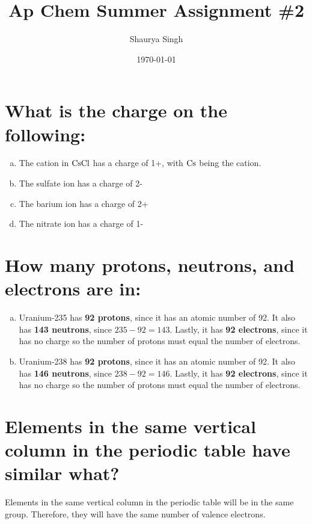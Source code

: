 \documentclass[11pt]{article}
\author{Shaurya Singh}
\date{\today}
\title{Ap Chem Summer Assignment \#2}
\begin{document}
\maketitle

\section{What is the charge on the following:}
\label{sec:org0d3ab7a}
\begin{enumerate}[(a)]
\item The cation in \(\ce{CsCl}\) has a charge of 1+, with \(\ce{Cs}\) being the cation.
\item The sulfate ion has a charge of 2-
\item The barium ion has a charge of 2+
\item The nitrate ion has a charge of 1-
\end{enumerate}

\section{How many protons, neutrons, and electrons are in:}
\label{sec:org8a06512}
\begin{enumerate}[(a)]
\item Uranium-235 has \textbf{92 protons}, since it has an atomic number of 92. It also has \textbf{143 neutrons}, since \(235-92=143\). Lastly, it has \textbf{92 electrons}, since it has no charge so the number of protons must equal the number of electrons.
\item Uranium-238 has \textbf{92 protons}, since it has an atomic number of 92. It also has \textbf{146 neutrons}, since \(238-92=146\). Lastly, it has \textbf{92 electrons}, since it has no charge so the number of protons must equal the number of electrons.
\end{enumerate}

\section{Elements in the same vertical column in the periodic table have similar what?}
\label{sec:orge42a97b}
Elements in the same vertical column in the periodic table will be in the same group. Therefore, they will have the same number of valence electrons.
\end{document}
